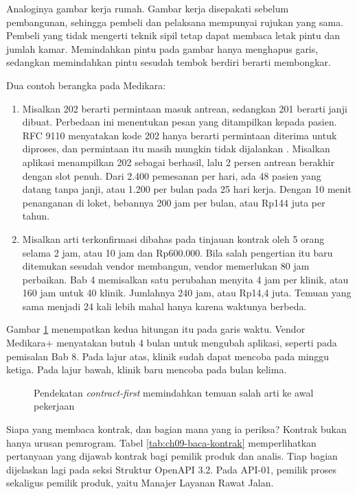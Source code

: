 Analoginya gambar kerja rumah. Gambar kerja disepakati sebelum pembangunan, sehingga pembeli dan pelaksana mempunyai rujukan yang
sama. Pembeli yang tidak mengerti teknik sipil tetap dapat membaca letak pintu dan jumlah kamar. Memindahkan pintu pada gambar hanya
menghapus garis, sedangkan memindahkan pintu sesudah tembok berdiri berarti membongkar.

Dua contoh berangka pada Medikara:
\begin{enumerate}
  \item Misalkan 202 berarti permintaan masuk antrean, sedangkan 201 berarti janji dibuat. Perbedaan ini menentukan pesan yang
        ditampilkan kepada pasien. RFC 9110 menyatakan kode 202 hanya berarti permintaan diterima untuk diproses, dan permintaan itu
        masih mungkin tidak dijalankan \cite{rfc9110}. Misalkan aplikasi menampilkan 202 sebagai berhasil, lalu 2 persen antrean
        berakhir dengan slot penuh. Dari 2.400 pemesanan per hari, ada 48 pasien yang datang tanpa janji, atau 1.200 per bulan pada
        25 hari kerja. Dengan 10 menit penanganan di loket, bebannya 200 jam per bulan, atau Rp144 juta per tahun.
  \item Misalkan arti terkonfirmasi dibahas pada tinjauan kontrak oleh 5 orang selama 2 jam, atau 10 jam dan Rp600.000. Bila salah
        pengertian itu baru ditemukan sesudah vendor membangun, vendor memerlukan 80 jam perbaikan. Bab 4 memisalkan satu perubahan
        menyita 4 jam per klinik, atau 160 jam untuk 40 klinik. Jumlahnya 240 jam, atau Rp14,4 juta. Temuan yang sama menjadi 24 kali
        lebih mahal hanya karena waktunya berbeda.
\end{enumerate}

Gambar \ref{fig:ch09-alur} menempatkan kedua hitungan itu pada garis waktu. Vendor Medikara+ menyatakan butuh 4 bulan untuk mengubah
aplikasi, seperti pada pemisalan Bab 8. Pada lajur atas, klinik sudah dapat mencoba pada minggu ketiga. Pada lajur bawah, klinik baru
mencoba pada bulan kelima.

\begin{figure}[!htb]
  \centering
  
  \caption{Pendekatan \textit{contract-first} memindahkan temuan salah arti ke awal pekerjaan}
  \label{fig:ch09-alur}
\end{figure}

Siapa yang membaca kontrak, dan bagian mana yang ia periksa? Kontrak bukan hanya urusan pemrogram. Tabel \ref{tab:ch09-baca-kontrak}
memperlihatkan pertanyaan yang dijawab kontrak bagi pemilik produk dan analis. Tiap bagian dijelaskan lagi pada seksi Struktur OpenAPI
3.2. Pada API-01, pemilik proses sekaligus pemilik produk, yaitu Manajer Layanan Rawat Jalan.

